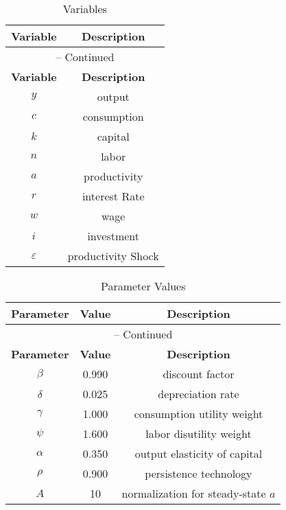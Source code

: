 \begin{minipage}{.5\linewidth}
\begin{center}
\begin{longtable}{cc}
\caption{Variables}
\label{tbl:RBC.Variables}\\%
\hline%
\multicolumn{1}{c}{\textbf{Variable}} &
\multicolumn{1}{c}{\textbf{Description}}\\%
\hline\hline%
\endfirsthead
\multicolumn{2}{c}{{\tablename} \thetable{} -- Continued}\\%
\hline%
\multicolumn{1}{c}{\textbf{Variable}} &
\multicolumn{1}{c}{\textbf{Description}}\\%
\hline\hline%
\endhead
${y}$ & output\\
${c}$ & consumption\\
${k}$ & capital\\
${n}$ & labor\\
${a}$ & productivity\\
${r}$ & interest Rate\\
${w}$ & wage\\
${i}$ & investment\\
${\varepsilon}$ & productivity Shock\\
\bottomrule%
\end{longtable}
\end{center}
\end{minipage}%
\begin{minipage}{.5\linewidth}
\begin{center}
\begin{longtable}{ccc}
\caption{Parameter Values}
\label{tbl:RBC.Parameters}\\%
\toprule%
\multicolumn{1}{c}{\textbf{Parameter}} &
\multicolumn{1}{c}{\textbf{Value}} &
\multicolumn{1}{c}{\textbf{Description}}\\%
\midrule%
\endfirsthead
\multicolumn{3}{c}{{\tablename} \thetable{} -- Continued}\\%
\midrule%
\multicolumn{1}{c}{\textbf{Parameter}} &
\multicolumn{1}{c}{\textbf{Value}} &
    \multicolumn{1}{c}{\textbf{Description}}\\%
\midrule%
\endhead
${\beta}$ 	 & 	 0.990 	 & 	 discount factor\\
${\delta}$ 	 & 	 0.025 	 & 	 depreciation rate\\
${\gamma}$ 	 & 	 1.000 	 & 	 consumption utility weight\\
${\psi}$ 	 & 	 1.600 	 & 	 labor disutility weight\\
${\alpha}$ 	 & 	 0.350 	 & 	 output elasticity of capital\\
${\rho}$ 	 & 	 0.900 	 & 	 persistence technology\\
$A$          &   10      &   normalization for steady-state $a$\\
\bottomrule%
\end{longtable}
\end{center}
\end{minipage} 